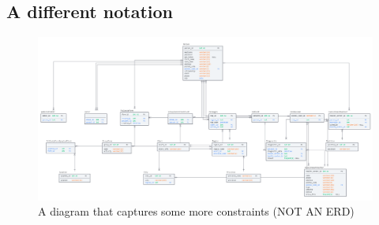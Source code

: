 \subsection{A different notation}
\begin{figure}[H]
    \centering
    \includegraphics[scale=0.34]{imgs/nOtAnErD.png}
    \caption{A diagram that captures some more constraints (NOT AN ERD)}
\end{figure}
